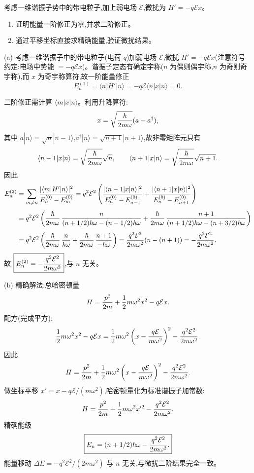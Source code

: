 \begin{question}
考虑一维谐振子势中的带电粒子,加上弱电场 $\mathcal E$,微扰为 $H'=-q\mathcal E x$。
\begin{enumerate}
\item 证明能量一阶修正为零,并求二阶修正。
\item 通过平移坐标直接求精确能量,验证微扰结果。
\end{enumerate}
\end{question}
\begin{solution}
(a) 考虑一维谐振子中的带电粒子(电荷 $q$)加弱电场 $\mathcal E$,微扰 $H'=-q\mathcal Ex$(注意符号约定:电场中势能 $=-q\mathcal E x$)。谐振子定态有确定宇称($n$ 为偶则偶宇称,$n$ 为奇则奇宇称),而 $x$ 为奇宇称算符,故一阶能量修正
\[
E_n^{(1)}=\langle n|H'|n\rangle=-q\mathcal E\langle n|x|n\rangle=0.
\]

二阶修正需计算 $\langle m|x|n\rangle$。利用升降算符:
\[
x=\sqrt{\hbar\over2m\omega}(a+a^\dagger),
\]
其中 $a|n\rangle=\sqrt{n}|n-1\rangle$,$a^\dagger|n\rangle=\sqrt{n+1}|n+1\rangle$,故非零矩阵元只有
\[
\langle n-1|x|n\rangle=\sqrt{\hbar\over2m\omega}\sqrt{n},
\qquad
\langle n+1|x|n\rangle=\sqrt{\hbar\over2m\omega}\sqrt{n+1}.
\]
因此
\[
\begin{aligned}
E_n^{(2)}&=\sum_{m\ne n}{|\langle m|H'|n\rangle|^2\over E_n^{(0)}-E_m^{(0)}}
=q^2\mathcal E^2\left(
{|\langle n-1|x|n\rangle|^2\over E_n^{(0)}-E_{n-1}^{(0)}}
+{|\langle n+1|x|n\rangle|^2\over E_n^{(0)}-E_{n+1}^{(0)}}\right)\\[4pt]
&=q^2\mathcal E^2\left(
{\hbar\over2m\omega}\,{n\over (n+1/2)\hbar\omega-(n-1/2)\hbar\omega}
+{\hbar\over2m\omega}\,{n+1\over (n+1/2)\hbar\omega-(n+3/2)\hbar\omega}\right)\\[4pt]
&=q^2\mathcal E^2\left(
{\hbar\over2m\omega}\,{n\over \hbar\omega}
+{\hbar\over2m\omega}\,{n+1\over -\hbar\omega}\right)
={q^2\mathcal E^2\over2m\omega^2}(n-(n+1))
=-{q^2\mathcal E^2\over2m\omega^2}.
\end{aligned}
\]
故 $\boxed{E_n^{(2)}=-{q^2\mathcal E^2\over2m\omega^2}}$,与 $n$ 无关。

(b) 精确解法:总哈密顿量
\[
H={p^2\over2m}+{1\over2}m\omega^2x^2-q\mathcal Ex.
\]
配方(完成平方):
\[
{1\over2}m\omega^2x^2-q\mathcal Ex
={1\over2}m\omega^2\left(x-{q\mathcal E\over m\omega^2}\right)^2-{q^2\mathcal E^2\over2m\omega^2}.
\]
因此
\[
H={p^2\over2m}+{1\over2}m\omega^2\left(x-{q\mathcal E\over m\omega^2}\right)^2-{q^2\mathcal E^2\over2m\omega^2}.
\]
做坐标平移 $x'=x-q\mathcal E/(m\omega^2)$,哈密顿量化为标准谐振子加常数:
\[
H={p^2\over2m}+{1\over2}m\omega^2x'^2-{q^2\mathcal E^2\over2m\omega^2},
\]
精确能级
\[
\boxed{E_n=(n+1/2)\hbar\omega-{q^2\mathcal E^2\over2m\omega^2}.}
\]
能量移动 $\Delta E=-q^2\mathcal E^2/(2m\omega^2)$ 与 $n$ 无关,与微扰二阶结果完全一致。
\end{solution}

